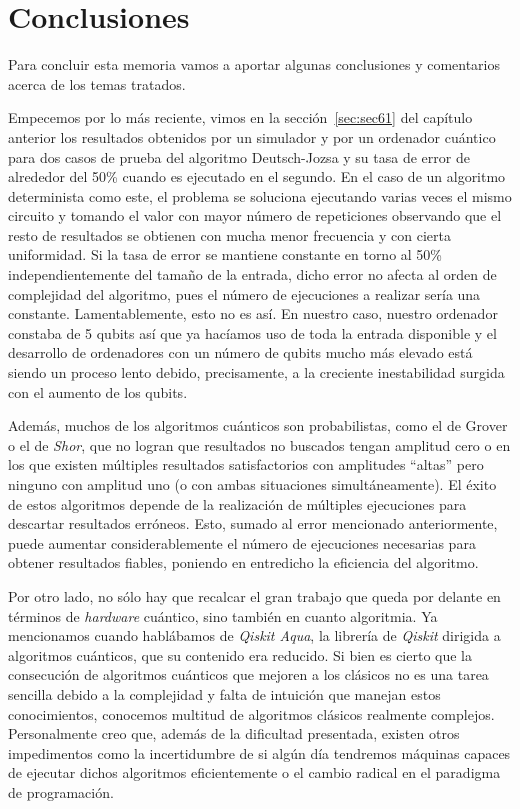 \chapter{Conclusiones}
\label{chapter7}

Para concluir esta memoria vamos a aportar algunas conclusiones y comentarios acerca de los temas tratados.

Empecemos por lo más reciente, vimos en la sección~\ref{sec:sec61} del capítulo anterior los resultados obtenidos por un simulador y por un ordenador cuántico para dos casos de prueba del algoritmo Deutsch-Jozsa y su tasa de error de alrededor del 50\% cuando es ejecutado en el segundo. En el caso de un algoritmo determinista como este, el problema se soluciona ejecutando varias veces el mismo circuito y tomando el valor con mayor número de repeticiones observando que el resto de resultados se obtienen con mucha menor frecuencia y con cierta uniformidad. Si la tasa de error se mantiene constante en torno al 50\% independientemente del tamaño de la entrada, dicho error no afecta al orden de complejidad del algoritmo, pues el número de ejecuciones a realizar sería una constante. Lamentablemente, esto no es así. En nuestro caso, nuestro ordenador constaba de 5 qubits así que ya hacíamos uso de toda la entrada disponible y el desarrollo de ordenadores con un número de qubits mucho más elevado está siendo un proceso lento debido, precisamente, a la creciente inestabilidad surgida con el aumento de los qubits.

Además, muchos de los algoritmos cuánticos son probabilistas, como el de Grover o el de \textit{Shor}, que no logran que resultados no buscados tengan amplitud cero o en los que existen múltiples resultados satisfactorios con amplitudes ``altas'' pero ninguno con amplitud uno (o con ambas situaciones simultáneamente). El éxito de estos algoritmos depende de la realización de múltiples ejecuciones para descartar resultados erróneos. Esto, sumado al error mencionado anteriormente, puede aumentar considerablemente el número de ejecuciones necesarias para obtener resultados fiables, poniendo en entredicho la eficiencia del algoritmo.

Por otro lado, no sólo hay que recalcar el gran trabajo que queda por delante en términos de \textit{hardware} cuántico, sino también en cuanto algoritmia. Ya mencionamos cuando hablábamos de \textit{Qiskit Aqua}, la librería de \textit{Qiskit} dirigida a algoritmos cuánticos, que su contenido era reducido. Si bien es cierto que la consecución de algoritmos cuánticos que mejoren a los clásicos no es una tarea sencilla debido a la complejidad y falta de intuición que manejan estos conocimientos, conocemos multitud de algoritmos clásicos realmente complejos. Personalmente creo que, además de la dificultad presentada, existen otros impedimentos como la incertidumbre de si algún día tendremos máquinas capaces de ejecutar dichos algoritmos eficientemente o el cambio radical en el paradigma de programación.

